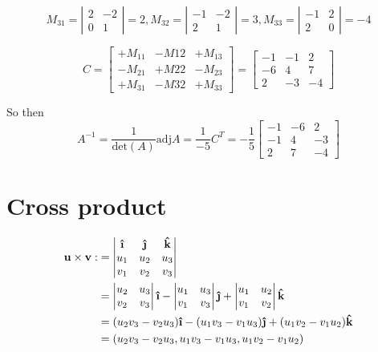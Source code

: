 \documentclass[11pt]{article}
\newcommand{\ihat}{\boldsymbol{\hat{\textbf{\i}}}}
\newcommand{\jhat}{\boldsymbol{\hat{\textbf{\j}}}}
\newcommand{\khat}{\boldsymbol{\hat{\textbf{k}}}}
\renewcommand{\vec}[1]{\mathbf{#1}}
\begin{document}
\[
M_{31} = \left| \begin{matrix}
2 & -2 \\
0 & 1
\end{matrix} \right|
= 2,
M_{32} = \left| \begin{matrix}
-1 & -2 \\
2 & 1
\end{matrix} \right|
= 3,
M_{33} = \left| \begin{matrix}
-1 & 2 \\
2 & 0
\end{matrix} \right|
= -4
\]

\[
C = \begin{bmatrix}
+M_{11} & -M{12} & +M_{13} \\
-M_{21} & +M{22} & -M_{23} \\
+M_{31} & -M{32} & +M_{33}
\end{bmatrix}
= \begin{bmatrix}
-1 & -1 & 2 \\
-6 & 4 & 7 \\
2 & -3 & -4
\end{bmatrix}
\]

So then
\[ A^{-1} = \frac{1}{\text{det}(A)} \text{adj}A = \frac{1}{-5}C^T = -\frac{1}{5} \begin{bmatrix}
-1 & -6 & 2 \\
-1 & 4 & -3 \\
2 & 7 & -4
\end{bmatrix}  \]

\section{Cross product}
\begin{align*}
\vec{u} \times \vec{v} :&= \left| \begin{matrix}
\ihat & \jhat & \khat \\
u_1 & u_2 & u_3 \\
v_1 & v_2 & v_3
\end{matrix} \right| \\
&= \left| \begin{matrix}
u_2 & u_3 \\
v_2 & v_3
\end{matrix} \right| \ihat
- \left| \begin{matrix}
u_1 & u_3 \\
v_1 & v_3
\end{matrix} \right| \jhat
+ \left| \begin{matrix}
u_1 & u_2 \\
v_1 & v_2
\end{matrix} \right| \khat \\
&= (u_2v_3 - v_2u_3)\ihat - (u_1v_3 - v_1u_3)\jhat + (u_1v_2 - v_1u_2)\khat \\
&= (u_2v_3 - v_2u_3, u_1v_3 - v_1u_3, u_1v_2 - v_1u_2)
\end{align*}
\end{document}
